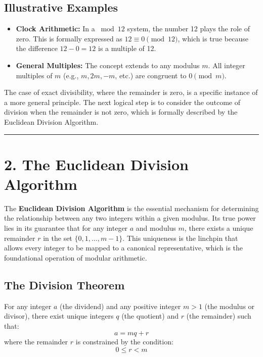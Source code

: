 \subsection*{Illustrative Examples}
\begin{itemize}
    \item \textbf{Clock Arithmetic:} In a $\bmod 12$ system, the number 12 plays the role of zero. This is formally expressed as $12 \equiv 0 \pmod{12}$, which is true because the difference $12 - 0 = 12$ is a multiple of 12.
    \item \textbf{General Multiples:} The concept extends to any modulus $m$. All integer multiples of $m$ (e.g., $m, 2m, -m$, etc.) are congruent to $0 \pmod{m}$.
\end{itemize}
The case of exact divisibility, where the remainder is zero, is a specific instance of a more general principle. The next logical step is to consider the outcome of division when the remainder is not zero, which is formally described by the Euclidean Division Algorithm.

\hrule

\section*{2. The Euclidean Division Algorithm}
The \textbf{Euclidean Division Algorithm} is the essential mechanism for determining the relationship between any two integers within a given modulus. Its true power lies in its guarantee that for any integer $a$ and modulus $m$, there exists a unique remainder $r$ in the set $\{0, 1, \dots, m-1\}$. This uniqueness is the linchpin that allows every integer to be mapped to a canonical representative, which is the foundational operation of modular arithmetic.

\subsection*{The Division Theorem}
\begin{proposition}
For any integer $a$ (the dividend) and any positive integer $m > 1$ (the modulus or divisor), there exist unique integers $q$ (the quotient) and $r$ (the remainder) such that:
$$ a = mq + r $$
where the remainder $r$ is constrained by the condition:
$$ 0 \leq r < m $$
\end{proposition}

